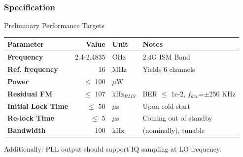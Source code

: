 \documentclass[t, screen, aspectratio=43]{beamer}
\begin{document}
\begin{frame}
	\frametitle{Specification}
	\begin{block}{Preliminary Performance Targets}
		\scriptsize
		\begin{table}[h!]
			\centering
			\def\arraystretch{1.5}		
			\setlength\arrayrulewidth{0.75pt}
			\setlength{\tabcolsep}{1em} %
			\begin{tabular}{|l|r|l|l|}
				\hline 
				\rule[-1ex]{0pt}{2.5ex} \cellcolor{gray!40}\textbf{Parameter} & \cellcolor{gray!40}\textbf{Value} & \cellcolor{gray!40}\textbf{Unit }& \cellcolor{gray!40}\textbf{Notes}\\ 
				\hline 
				\rule[-1ex]{0pt}{2.5ex} \textbf{Frequency}  & 2.4-2.4835 & GHz & 2.4G ISM Band\\ 
				\hline 
				\rule[-1ex]{0pt}{2.5ex} \textbf{Ref. frequency} & 16 & MHz & Yields 6 channels \\ 
				\hline 
				\rule[-1ex]{0pt}{2.5ex} \textbf{Power} & $\leq$ 100  &$\mu$W & \\ 
				\hline 
				\rule[-1ex]{0pt}{2.5ex} \textbf{Residual FM} & $\leq$ 107  &kHz$_{RMS}$ & BER $\leq$ 1e-2, $f_{dev}$=$\pm$250 KHz\\ 
				\hline 
				\rule[-1ex]{0pt}{2.5ex} \textbf{Initial Lock Time} & $\leq$ 50 & $\mu$s & Upon cold start \\ 
				\hline 
				\rule[-1ex]{0pt}{2.5ex} \textbf{Re-lock Time} & $\leq$ 5 & $\mu$s & Coming out of standby \\ 
				\hline 
				\rule[-1ex]{0pt}{2.5ex} \textbf{Bandwidth} & 100 & kHz & (nominally), tunable \\ 
				\hline 
			\end{tabular} 
		\end{table}   
		Additionally: PLL output should support IQ sampling at LO frequency.
	\end{block}    
\end{frame}

\end{document}
